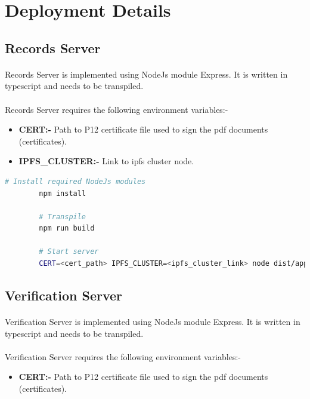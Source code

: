 \documentclass[12pt]{article}
\begin{document}
        


\section{Deployment Details}
    \subsection{Records Server}
        \paragraph{}
        Records Server is implemented using NodeJs module Express. It is written in typescript and needs to be transpiled.
        
        \paragraph{}
        Records Server requires the following environment variables:-
        \begin{itemize}
            \item \textbf{CERT:-} Path to P12 certificate file used to sign the \acrshort{pdf} documents (certificates).
            \item \textbf{IPFS\_CLUSTER:-} Link to \acrshort{ipfs} cluster node.
        \end{itemize}
        
        \begin{lstlisting}[language=bash, caption=Records Server]
        # Install required NodeJs modules
        npm install
    
        # Transpile
        npm run build
    
        # Start server
        CERT=<cert_path> IPFS_CLUSTER=<ipfs_cluster_link> node dist/app.js
        \end{lstlisting}
    
    \subsection{Verification Server}
        \paragraph{}
        Verification Server is implemented using NodeJs module Express. It is written in typescript and needs to be transpiled.
        
        \paragraph{}
        Verification Server requires the following environment variables:-
        \begin{itemize}
            \item \textbf{CERT:-} Path to P12 certificate file used to sign the \acrshort{pdf} documents (certificates).
        \end{itemize}
    
\end{document}

